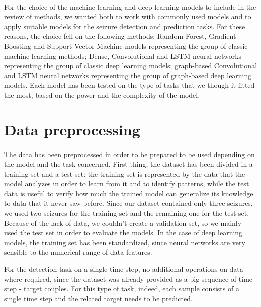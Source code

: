 \paragraph{} For the choice of the machine learning and deep learning models to include in the review of methods, we wanted both to work with commonly used models and to apply suitable models for the seizure detection and prediction tasks. For these reasons, the choice fell on the following methods: Random Forest, Gradient Boosting and Support Vector Machine models representing the group of classic machine learning methods; Dense, Convolutional and LSTM neural networks representing the group of classic deep learning models; graph-based Convolutional and LSTM neural networks representing the group of graph-based deep learning models. Each model has been tested on the type of tasks that we though it fitted the most, based on the power and the complexity of the model.


\section{Data preprocessing} \label{sec: step_data_preprocessing}
\paragraph{} The data has been preprocessed in order to be prepared to be used depending on the model and the task concerned. First thing, the dataset has been divided in a training set and a test set: the training set is represented by the data that the model analyzes in order to learn from it and to identify patterns, while the test data is useful to verify how much the trained model can generalize its knowledge to data that it never saw before. Since our dataset contained only three seizures, we used two seizures for the training set and the remaining one for the test set. Because of the lack of data, we couldn't create a validation set, so we mainly used the test set in order to evaluate the models. In the case of deep learning models, the training set has been standardized, since neural networks are very sensible to the numerical range of data features.

For the detection task on a single time step, no additional operations on data where required, since the dataset was already provided as a big sequence of time step - target couples. For this type of task, indeed, each sample consists of a single time step and the related target needs to be predicted.

